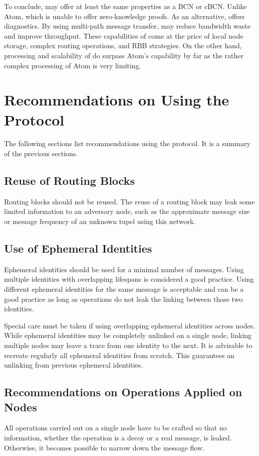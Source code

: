 To conclude, \MessageVortex{} may offer at least the same properties as a BCN or cBCN. Unlike Atom, which is unable to offer zero-knowledge proofs. As an alternative, \MessageVortex{} offers diagnostics. By using multi-path message transfer, \MessageVortex{} may reduce bandwidth waste and improve throughput. These capabilities of \MessageVortex{} come at the price of local node storage, complex routing operations, and RBB strategies. On the other hand, processing and scalability of \MessageVortex{} do surpass Atom's capability by far as the rather complex processing of Atom is very limiting.

\chapter{Recommendations on Using the \MessageVortex{} Protocol}
The following sections list recommendations using the \MessageVortex{} protocol. It is a summary of the previous sections.

\section{Reuse of Routing Blocks\label{sec:reuseRB}}
Routing blocks should not be reused. The reuse of a routing block may leak some limited information to an adversary node, such as the approximate message size or message frequency of an unknown tupel using this network.

\section{Use of Ephemeral Identities}
Ephemeral identities should be used for a minimal number of messages. Using multiple identities with overlapping lifespans is considered a good practice. Using different ephemeral identities for the same message is acceptable and can be a good practice as long as operations do not leak the linking between those two identities.

Special care must be taken if using overlapping ephemeral identities across nodes. While ephemeral identities may be completely unlinked on a single node, linking multiple nodes may leave a trace from one identity to the next. It is advisable to recreate regularly all ephemeral identities from scratch. This guarantees an unlinking from previous ephemeral identities.

\section{Recommendations on Operations Applied on Nodes}
All operations carried out on a single node have to be crafted so that no information, whether the operation is a decoy or a real message, is leaked. Otherwise, it becomes possible to narrow down the message flow.

